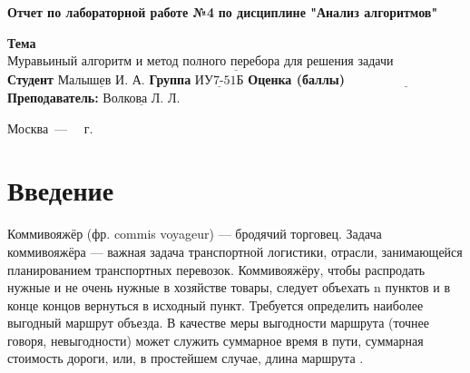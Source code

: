 \documentclass[12pt]{report}
\begin{document}
\begin{titlepage}
	
	\begin{center}
		\noindent\begin{minipage}{1.3\textwidth}\centering
			\Large\textbf{  Отчет по лабораторной работе №4}\newline
			\textbf{по дисциплине "Анализ алгоритмов"}\newline\newline
		\end{minipage}
	\end{center}
	
	\noindent\textbf{Тема} $\underline{\text{Муравьиный алгоритм и метод полного перебора для решения задачи коммивояжёра}}$\newline\newline
	\noindent\textbf{Студент} $\underline{\text{Малышев И. А.}}$\newline\newline
	\noindent\textbf{Группа} $\underline{\text{ИУ7-51Б}}$\newline\newline
	\noindent\textbf{Оценка (баллы)} $\underline{\text{~~~~~~~~~~~~~~~~~~~~~~~~~~~}}$\newline\newline
	\noindent\textbf{Преподаватель: } $\underline{\text{Волкова Л. Л.}}$\newline\newline\newline
	
	\begin{center}
		\vfill
		Москва~---~\the\year
		~г.
	\end{center}
\end{titlepage}


\renewcommand{\contentsname}{Содержание}
\tableofcontents

\newpage
\chapter*{Введение}
Коммивояжёр (фр. commis voyageur) — бродячий торговец. Задача коммивояжёра — важная задача транспортной логистики, отрасли, занимающейся планированием транспортных перевозок. Коммивояжёру, чтобы распродать нужные и не очень нужные в хозяйстве товары, следует объехать n пунктов и в конце концов вернуться в исходный пункт. Требуется определить наиболее выгодный маршрут объезда. В качестве меры выгодности маршрута (точнее говоря, невыгодности) может служить суммарное время в пути, суммарная стоимость дороги, или, в простейшем случае, длина маршрута \cite{commi1}.
\end{document}
